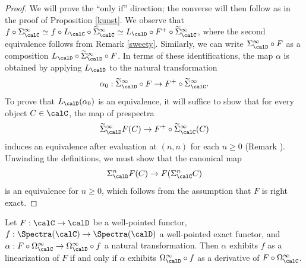 \begin{proof}
We will prove the ``only if'' direction; the converse will then follow as in the proof of
Proposition \ref{kunst}. We observe that $f \circ \Sigma^{\infty}_{\calC}
\simeq f \circ L_{\calC} \circ \widetilde{\Sigma}^{\infty}_{\calC} \simeq L_{\calD} \circ F^{+}
\circ \widetilde{\Sigma}^{\infty}_{\calC}$, where the second equivalence follows from
Remark \ref{sweety}. Similarly, we can write $\Sigma^{\infty}_{\calD} \circ F$
as a composition $L_{\calD} \circ \widetilde{\Sigma}^{\infty}_{\calD} \circ F$.
In terms of these identifications, the map $\alpha$ is obtained by applying
$L_{\calD}$ to the natural transformation
$$ \alpha_0: \widetilde{\Sigma}^{\infty}_{\calD} \circ F \rightarrow F^{+} \circ \widetilde{ \Sigma}^{\infty}_{\calC}.$$
To prove that $L_{\calD}(\alpha_0)$ is an equivalence, it will suffice to show that for every
object $C \in \calC$, the map of prespectra
$$ \widetilde{\Sigma}^{\infty}_{\calD} F(C) \rightarrow F^{+} \circ \widetilde{\Sigma}^{\infty}_{\calC}(C)$$
induces an equivalence after evaluation at $(n,n)$ for each $n \geq 0$ (Remark ).
Unwinding the definitions, we must show that the canonical map
$$ \Sigma^{n}_{\calD} F(C) \rightarrow F( \Sigma^{n}_{\calC} C)$$
is an equivalence for $n \geq 0$, which follows from the assumption that $F$ is right exact.
\end{proof}

\begin{proposition}\label{staleman}
Let $F: \calC \rightarrow \calD$ be a well-pointed functor, $f: \Spectra(\calC) \rightarrow
\Spectra(\calD)$ a well-pointed exact functor, and 
$\alpha: F \circ \Omega^{\infty}_{\calC} \rightarrow \Omega^{\infty}_{\calD} \circ f$
a natural transformation. Then $\alpha$ exhibits $f$ as a linearization of $F$ if and only if
$\alpha$ exhibits $\Omega^{\infty}_{\calD} \circ f$ as
a derivative of $F \circ \Omega^{\infty}_{\calC}$.
\end{proposition}

